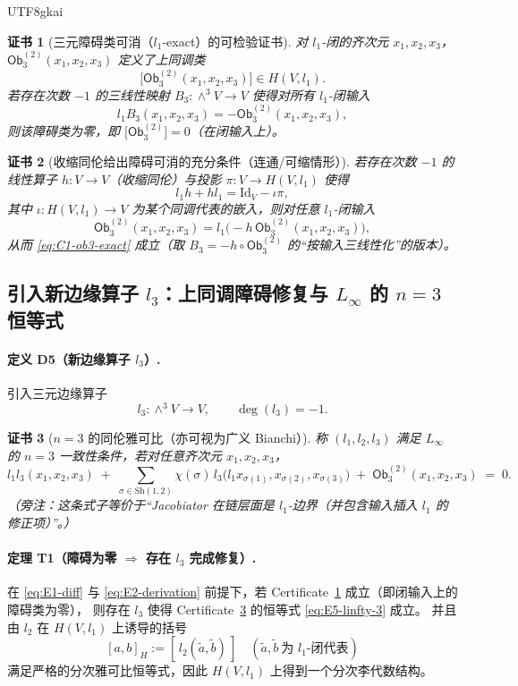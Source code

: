 \documentclass[12pt]{article}
\newtheorem{Certificate}{证书}[section]
\newcommand{\Ob}{\ensuremath{\mathsf{Ob}}}
\begin{document}
\begin{CJK*}{UTF8}{gkai}
\begin{Certificate}[三元障碍类可消（$l_1$-exact）的可检验证书]
\label{cert:edge-ob3-exact}
对 $l_1$-闭的齐次元 $x_1,x_2,x_3$，$\Ob_3^{(2)}(x_1,x_2,x_3)$ 定义了上同调类
\[
\bigl[\Ob_3^{(2)}(x_1,x_2,x_3)\bigr]\in H(V,l_1).
\]
若存在次数 $-1$ 的三线性映射 $B_3:\wedge^3V\to V$ 使得对所有 $l_1$-闭输入
\[
l_1 B_3(x_1,x_2,x_3)=-\Ob_3^{(2)}(x_1,x_2,x_3),
\tag{C1}
\label{eq:C1-ob3-exact}
\]
则该障碍类为零，即 $\bigl[\Ob_3^{(2)}\bigr]=0$（在闭输入上）。
\end{Certificate}

\begin{Certificate}[收缩同伦给出障碍可消的充分条件（连通/可缩情形）]
\label{cert:edge-contraction-suffices}
若存在次数 $-1$ 的线性算子 $h:V\to V$（收缩同伦）与投影 $\pi:V\to H(V,l_1)$ 使得
\[
l_1h+hl_1=\mathrm{Id}_V-\iota\pi,
\tag{C2}
\label{eq:C2-contraction}
\]
其中 $\iota:H(V,l_1)\to V$ 为某个同调代表的嵌入，则对任意 $l_1$-闭输入
\[
\Ob_3^{(2)}(x_1,x_2,x_3)=l_1\bigl(-h\,\Ob_3^{(2)}(x_1,x_2,x_3)\bigr),
\]
从而 \eqref{eq:C1-ob3-exact} 成立（取 $B_3=-h\circ \Ob_3^{(2)}$ 的“按输入三线性化”的版本）。
\end{Certificate}

\subsection{引入新边缘算子 $l_3$：上同调障碍修复与 $L_\infty$ 的 $n=3$ 恒等式}
\label{subsec:edge-op-add-l3}

\paragraph{定义 D5（新边缘算子 $l_3$）.}
引入三元边缘算子
\[
l_3:\wedge^3V\to V,\qquad \deg(l_3)=-1.
\]

\begin{Certificate}[$n=3$ 的同伦雅可比（亦可视为广义 Bianchi）]
\label{cert:edge-linfty-n3}
称 $(l_1,l_2,l_3)$ 满足 $L_\infty$ 的 $n=3$ 一致性条件，若对任意齐次元 $x_1,x_2,x_3$，
\[
l_1l_3(x_1,x_2,x_3)
\;+\;
\sum_{\sigma\in\mathrm{Sh}(1,2)}\chi(\sigma)\,
l_3\!\bigl(l_1x_{\sigma(1)},x_{\sigma(2)},x_{\sigma(3)}\bigr)
\;+\;
\Ob_3^{(2)}(x_1,x_2,x_3)
\;=\;0.
\tag{E5}
\label{eq:E5-linfty-3}
\]
（旁注：这条式子等价于“Jacobiator 在链层面是 $l_1$-边界（并包含输入插入 $l_1$ 的修正项）”。）
\end{Certificate}

\paragraph{定理 T1（障碍为零 $\Rightarrow$ 存在 $l_3$ 完成修复）.}
在 \eqref{eq:E1-diff} 与 \eqref{eq:E2-derivation} 前提下，若 Certificate~\ref{cert:edge-ob3-exact} 成立（即闭输入上的障碍类为零），
则存在 $l_3$ 使得 Certificate~\ref{cert:edge-linfty-n3} 的恒等式 \eqref{eq:E5-linfty-3} 成立。
并且由 $l_2$ 在 $H(V,l_1)$ 上诱导的括号
\[
[a,b]_{H}:=[\,l_2(\tilde a,\tilde b)\,]\quad (\tilde a,\tilde b\ \text{为 }l_1\text{-闭代表})
\]
满足严格的分次雅可比恒等式，因此 $H(V,l_1)$ 上得到一个分次李代数结构。


\end{CJK*}
\end{document}
